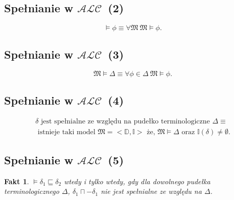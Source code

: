\documentclass[12pt]{article}
\newtheorem{fakt}{Fakt}
\begin{document}
\subsection{Spełnianie w $\mathcal{ALC}$~(2)}
%
\begin{equation}
\vDash \phi \equiv \forall \mathfrak{M}~ \mathfrak{M}\vDash \phi.
\end{equation}
%

\subsection{Spełnianie w $\mathcal{ALC}$~(3)}
%
\begin{equation}
\mathfrak{M} \vDash \Delta \equiv \forall \phi \in \Delta ~\mathfrak{M} \vDash \phi.
\end{equation}
%

\subsection{Spełnianie w $\mathcal{ALC}$~(4)}
%
\begin{eqnarray}
\delta \text{ jest spełnialne ze względu na pudełko terminologiczne } \Delta \equiv \nonumber \\ 
\text{ istnieje taki model } \mathfrak{M}=<\mathbb{D}, \mathbb{I}> \text{ że, } \mathfrak{M}\vDash \Delta \text{ oraz } \mathbb{I}(\delta) \neq \emptyset.
\end{eqnarray}
%

\subsection{Spełnianie w $\mathcal{ALC}$~(5)}
%
\begin{fakt}
$\vDash \delta_{1} \sqsubseteq \delta_{2}$ wtedy i tylko wtedy, gdy dla dowolnego pudełka terminologicznego $\Delta$, $\delta_1 \sqcap - \delta_1$ nie jest spełnialne ze względu na $\Delta$.
\end{fakt}
%
\end{document}
